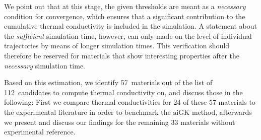 %
We point out that at this stage, the given thresholds are meant as a \emph{necessary} condition for convergence, which ensures that a significant contribution to the cumulative thermal conductivity is included in the simulation. A statement about the \emph{sufficient} simulation time, however, can only made on the level of individual trajectories by means of longer simulation times. This verification should therefore be reserved for materials that show interesting properties after the \emph{necessary} simulation time.

Based on this estimation, we identify 57~materials out of the list of 112~candidates to compute thermal conductivity on, and discuss those in the following: First we compare thermal conductivities for 24 of these 57 materials to the experimental literature in order to benchmark the aiGK method, afterwards we present and discuss our findings for the remaining 33 materials without experimental reference.




